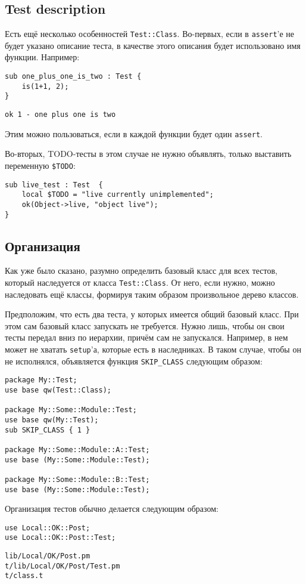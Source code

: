 \subsection{Test description}
Есть ещё несколько особенностей \verb|Test::Class|. Во-первых, если в \verb|assert|'е не будет указано описание теста, в качестве этого описания будет использовано имя функции. Например:
\begin{verbatim}
sub one_plus_one_is_two : Test {
    is(1+1, 2);
}
\end{verbatim}
\begin{verbatim}
ok 1 - one plus one is two
\end{verbatim}
Этим можно пользоваться, если в каждой функции будет один \verb|assert|.

Во-вторых, TODO-тесты в этом случае не нужно объявлять, только выставить переменную \verb|$TODO|:
\begin{verbatim}
sub live_test : Test  {
    local $TODO = "live currently unimplemented";
    ok(Object->live, "object live");
}
\end{verbatim}

\subsection{Организация}
Как уже было сказано, разумно определить базовый класс для всех тестов, который наследуется от класса \verb|Test::Class|. От него, если нужно, можно наследовать ещё классы, формируя таким образом произвольное дерево классов.

Предположим, что есть два теста, у которых имеется общий базовый класс. При этом сам базовый класс запускать не требуется. Нужно лишь, чтобы он свои тесты передал вниз по иерархии, причём сам не запускался. Например, в нем может не хватать \verb|setup|'а, которые есть в наследниках. В таком случае, чтобы он не исполнялся, объявляется функция \verb|SKIP_CLASS| следующим образом:
\begin{verbatim}
package My::Test;
use base qw(Test::Class);

package My::Some::Module::Test;
use base qw(My::Test);
sub SKIP_CLASS { 1 }

package My::Some::Module::A::Test;
use base (My::Some::Module::Test);

package My::Some::Module::B::Test;
use base (My::Some::Module::Test);
\end{verbatim}
Организация тестов обычно делается следующим образом:
\begin{verbatim}
use Local::OK::Post;
use Local::OK::Post::Test;
\end{verbatim}
\begin{verbatim}
lib/Local/OK/Post.pm
t/lib/Local/OK/Post/Test.pm
t/class.t
\end{verbatim}

